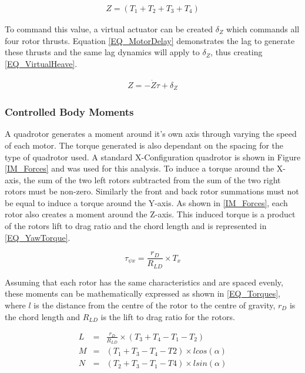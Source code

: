 		\begin{eqnarray}
		Z = (T_1 + T_2 + T_3 + T_4)
		\label{EQ_Translational}
		\end{eqnarray}
		
		To command this value, a virtual actuator can be created $\delta_{Z}$ which commands all four rotor thrusts. Equation \eqref{EQ_MotorDelay} demonstrates the lag to generate these thrusts and the same lag dynamics will apply to $\delta_{Z}$, thus creating \eqref{EQ_VirtualHeave}.
		
		\begin{eqnarray}
		Z = -\dot{Z} \tau + \delta_Z
		\label{EQ_VirtualHeave}
		\end{eqnarray}
				
		\subsubsection{Controlled Body Moments}
		A quadrotor generates a moment around it's own axis through varying the speed of each motor. The torque generated is also dependant on the spacing for the type of quadrotor used. A standard X-Configuration quadrotor is shown in Figure \ref{IM_Forces} and was used for this analysis. To induce a torque around the X-axis, the sum of the two left rotors subtracted from the sum of the two right rotors must be non-zero. Similarly the front and back rotor summations must not be equal to induce a torque around the Y-axis. As shown in \ref{IM_Forces}, each rotor also creates a moment around the Z-axis. This induced torque is a product of the rotors lift to drag ratio and the chord length and is represented in \eqref{EQ_YawTorque}.
		
		\begin{equation}
		\tau_{\psi x} = \frac{r_D}{R_{LD}} \times T_x
		\label{EQ_YawTorque}
		\end{equation}
				
		Assuming that each rotor has the same characteristics and are spaced evenly, these moments can be mathematically expressed as shown in \eqref{EQ_Torques}, where $l$ is the distance from the centre of the rotor to the centre of gravity, $r_D$ is the chord length and $R_{LD}$ is the lift to drag ratio for the rotors.
				
		\begin{eqnarray}
		L &=& \frac{r_D}{R_{LD}} \times (T_3 + T_4 - T_1 - T_2)\\
		M &=& (T_1 + T_3 - T_4 - T2) \times lcos(\alpha)\\
		N &=& (T_2 + T_3 - T_1 - T4) \times lsin(\alpha)
		\label{EQ_Torques}
		\end{eqnarray}
		
